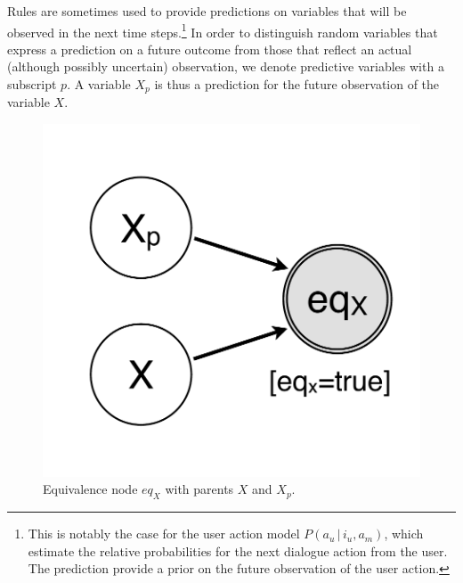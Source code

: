Rules are sometimes used to provide predictions on variables that will be observed in the next time steps.\footnote{This is notably the case for the user action model $P(a_u \, | \, i_u, a_m)$, which estimate the relative probabilities for the next dialogue action from the user. The prediction provide a prior on the future observation of the user action.} In order to distinguish random variables that express a prediction on a future outcome from those that reflect an actual (although possibly uncertain) observation, we denote predictive variables with a subscript $p$. A variable $X_p$ is thus a prediction for the future observation of the variable $X$. 

\begin{figure}
\vspace{-4mm}
\centering
\includegraphics[scale=0.25]{imgs/prediction.pdf} 
\vspace{-4mm}
\caption{Equivalence node $eq_{X}$ with parents $X$ and $X_p$.}
\label{fig:prediction}
\end{figure}


